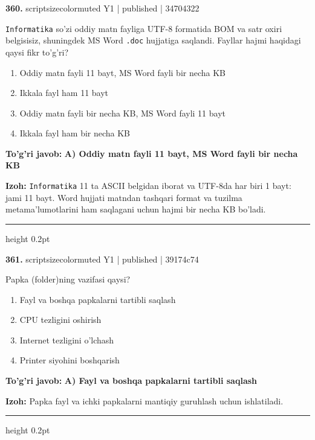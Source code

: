 \documentclass[10pt,a4paper]{article}
\begin{document}
{\bfseries\sffamily\color{ink} 360.} {scriptsizecolor{muted} Y1 | published | 34704322}
\par
\texttt{Informatika} so'zi oddiy matn fayliga UTF-8 formatida BOM va satr oxiri belgisisiz, shuningdek MS Word \texttt{.doc} hujjatiga saqlandi. Fayllar hajmi haqidagi qaysi fikr to'g'ri?
\begin{enumerate}[label=\Alph*),leftmargin=9mm]
\item Oddiy matn fayli 11 bayt, MS Word fayli bir necha KB
\item Ikkala fayl ham 11 bayt
\item Oddiy matn fayli bir necha KB, MS Word fayli 11 bayt
\item Ikkala fayl ham bir necha KB
\end{enumerate}
\begin{tcolorbox}[enhanced,breakable,colback=teal!4,colframe=teal!60!black,boxrule=0.45pt,arc=1.2mm,left=2.7mm,right=2.7mm,top=1.8mm,bottom=1.8mm,before skip=2mm,after skip=2mm]
{\bfseries\sffamily\color{teal}To'g'ri javob:} \textbf{A) Oddiy matn fayli 11 bayt, MS Word fayli bir necha KB}
\par\smallskip
{\bfseries Izoh:} \texttt{Informatika} 11 ta ASCII belgidan iborat va UTF-8da har biri 1 bayt: jami 11 bayt. Word hujjati matndan tashqari format va tuzilma metama'lumotlarini ham saqlagani uchun hajmi bir necha KB bo'ladi.
\end{tcolorbox}
\vspace{2mm}\hrule height 0.2pt\vspace{3mm}

{\bfseries\sffamily\color{ink} 361.} {scriptsizecolor{muted} Y1 | published | 39174c74}
\par
Papka (folder)ning vazifasi qaysi?
\begin{enumerate}[label=\Alph*),leftmargin=9mm]
\item Fayl va boshqa papkalarni tartibli saqlash
\item CPU tezligini oshirish
\item Internet tezligini o'lchash
\item Printer siyohini boshqarish
\end{enumerate}
\begin{tcolorbox}[enhanced,breakable,colback=teal!4,colframe=teal!60!black,boxrule=0.45pt,arc=1.2mm,left=2.7mm,right=2.7mm,top=1.8mm,bottom=1.8mm,before skip=2mm,after skip=2mm]
{\bfseries\sffamily\color{teal}To'g'ri javob:} \textbf{A) Fayl va boshqa papkalarni tartibli saqlash}
\par\smallskip
{\bfseries Izoh:} Papka fayl va ichki papkalarni mantiqiy guruhlash uchun ishlatiladi.
\end{tcolorbox}
\vspace{2mm}\hrule height 0.2pt\vspace{3mm}
\end{document}

